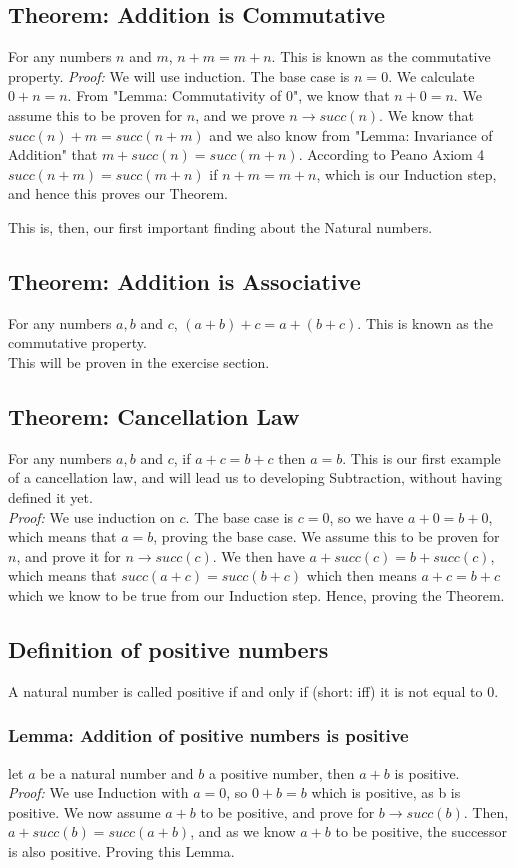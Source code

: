 \documentclass[]{scrbook}
\begin{document}
\subsection{Theorem: Addition is Commutative}
For any numbers $n$ and $m$, $n + m = m + n$. This is known as the commutative property.
\textit{Proof:} We will use induction. The base case is $n = 0$. We calculate $0 + n = n$. From "Lemma: Commutativity of 0", we know that $n + 0 = n$. We assume this to be proven for $n$, and we prove $n\rightarrow succ(n)$. We know that $succ(n) + m = succ(n + m)$ and we also know from "Lemma: Invariance of Addition" that $m + succ(n) = succ(m + n)$. According to Peano Axiom 4 $succ(n+m) = succ(m+n)$ if $n+m=m+n$, which is our Induction step, and hence this proves our Theorem.

This is, then, our first important finding about the Natural numbers.

\subsection{Theorem: Addition is Associative}
For any numbers $a,b$ and $c$, $(a+b)+c = a+(b+c)$. This is known as the commutative property.\\
This will be proven in the exercise section.

\subsection{Theorem: Cancellation Law}
For any numbers $a,b$ and $c$, if $a + c = b + c$ then $a = b$. This is our first example of a cancellation law, and will lead us to developing Subtraction, without having defined it yet.\\
\textit{Proof:} We use induction on $c$. The base case is $c = 0$, so we have $a + 0 = b + 0$, which means that $a = b$, proving the base case. We assume this to be proven for $n$, and prove it for $n\rightarrow succ(c)$. We then have $a + succ(c) = b + succ(c)$, which means that $succ (a+c) = succ(b+c)$ which then means $a+c = b+c$ which we know to be true from our Induction step. Hence, proving the Theorem.

\subsection{Definition of positive numbers}
A natural number is called positive if and only if (short: iff) it is not equal to 0.

\subsubsection*{Lemma: Addition of positive numbers is positive}
let $a$ be a natural number and $b$ a positive number, then $a + b$ is positive.\\
\textit{Proof:} We use Induction with $a = 0$, so $0 + b = b$ which is positive, as b is positive. We now assume $a+b$ to be positive, and prove for $b\rightarrow succ(b)$. Then, $a + succ(b) = succ(a + b)$, and as we know $a+b$ to be positive, the successor is also positive. Proving this Lemma.
\end{document}
